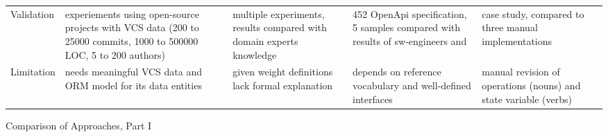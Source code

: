 {\begin{landscape}
\begin{threeparttable}[h!]
\begin{tabularx}{\linewidth}{XXXXX}
			Validation & experiements using open-source projects with VCS data (200 to 25000 commits, 1000 to 500000 LOC, 5 to 200 authors)  & multiple experiments, results compared with domain experts knowledge  & 452 OpenApi specification, 5 samples compared with results of sw-engineers and \cite{ServiceCutter}& case study, compared to three manual implementations \\
			
			Limitation & needs meaningful VCS data and ORM model for its data entities & given weight definitions lack formal explanation    & depends on reference vocabulary and well-defined interfaces & manual revision of operations (nouns) and state variable (verbs) \\
			
		\end{tabularx}
		\caption{Comparison of Approaches, Part I}
	\label{tab:compareApproaches1}
	 
	
	
	\end{threeparttable}
	

	
	\end{landscape}
	\clearpage%
}

